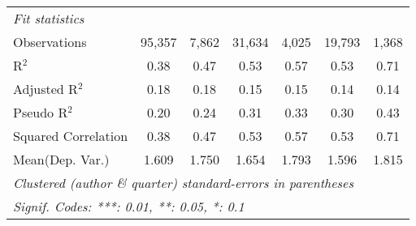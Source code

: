 \begin{tabular}{lcccccc}
   \midrule
   \emph{Fit statistics}\\
   Observations                                               & 95,357       & 7,862   & 31,634       & 4,025   & 19,793        & 1,368\\  
   R$^2$                                                      & 0.38         & 0.47    & 0.53         & 0.57    & 0.53          & 0.71\\  
   Adjusted R$^2$                                             & 0.18         & 0.18    & 0.15         & 0.15    & 0.14          & 0.14\\  
   Pseudo R$^2$                                               & 0.20         & 0.24    & 0.31         & 0.33    & 0.30          & 0.43\\  
   Squared Correlation                                        & 0.38         & 0.47    & 0.53         & 0.57    & 0.53          & 0.71\\  
Mean(Dep. Var.) & 1.609 & 1.750 & 1.654 & 1.793 & 1.596 & 1.815 \\
   \midrule \midrule
   \multicolumn{7}{l}{\emph{Clustered (author \& quarter) standard-errors in parentheses}}\\
   \multicolumn{7}{l}{\emph{Signif. Codes: ***: 0.01, **: 0.05, *: 0.1}}\\
\end{tabular}
\par\endgroup

